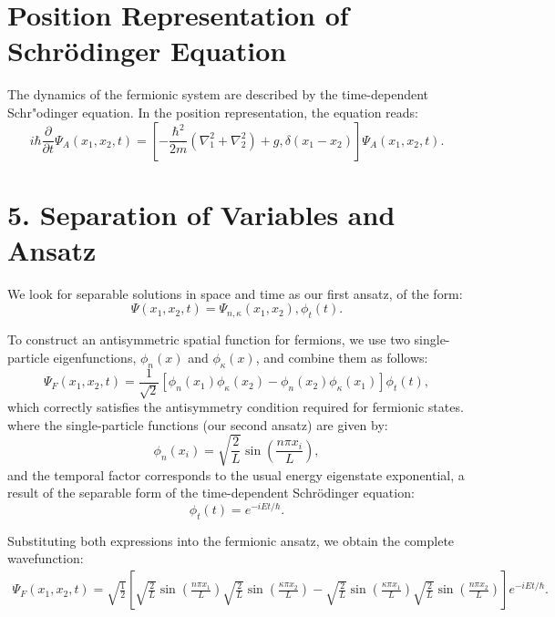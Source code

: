 \section{Position Representation of Schr\"odinger Equation}

The dynamics of the fermionic system are described by the time-dependent
Schr"odinger equation. In the position representation, the equation reads:
\begin{equation}
	i\hbar\frac{\partial}{\partial t}\Psi_A(x_1, x_2, t) = \left[
	-\frac{\hbar^2}{2m}(\nabla_1^2 + \nabla_2^2) + g,\delta(x_1 - x_2) \right]
	\Psi_A(x_1, x_2, t).
\end{equation}

\section*{5. Separation of Variables and Ansatz}

We look for separable solutions in space and time as our first ansatz, of the form:
\begin{equation}
	\Psi(x_1, x_2, t) = \Psi_{n,\kappa}(x_1, x_2),\phi_t(t).
\end{equation}

To construct an antisymmetric spatial function for fermions, we use two single-particle eigenfunctions, $\phi_n(x)$ and $\phi_\kappa(x)$, and combine them as follows:
\begin{equation}
	\Psi_F(x_1, x_2, t) = \frac{1}{\sqrt{2}}\left[\phi_n(x_1)\phi_\kappa(x_2) - \phi_n(x_2)\phi_\kappa(x_1)\right]\phi_t(t),
\end{equation}
which correctly satisfies the antisymmetry condition required for fermionic states.
where the single-particle functions (our second ansatz) are given by:
\begin{equation}
	\phi_n(x_i) = \sqrt{\frac{2}{L}}\sin\left(\frac{n\pi x_i}{L}\right),
\end{equation}
and the temporal factor corresponds to the usual energy eigenstate exponential, a result of the separable form of the time-dependent Schrödinger equation:
\begin{equation}
	\phi_t(t) = e^{-iEt/\hbar}.
\end{equation}

Substituting both expressions into the fermionic ansatz, we obtain the complete wavefunction:
\begin{align}
	\Psi_F(x_1, x_2, t) = \sqrt{\frac{1}{2}}\left[\sqrt{\frac{2}{L}}\sin\left(\frac{n\pi x_1}{L}\right)\sqrt{\frac{2}{L}}\sin\left(\frac{\kappa\pi x_2}{L}\right)
	- \sqrt{\frac{2}{L}}\sin\left(\frac{\kappa\pi x_1}{L}\right)\sqrt{\frac{2}{L}}\sin\left(\frac{n\pi x_2}{L}\right)\right] e^{-iEt/\hbar}.
\end{align}

